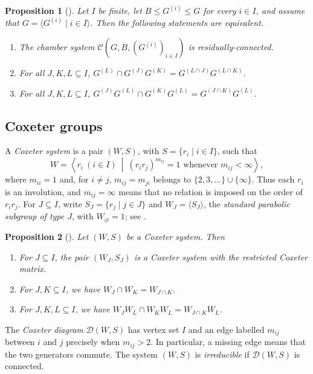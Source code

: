 \documentclass[10pt,a4paper]{amsart}
\newtheorem{prop}{Proposition}[section]
\newcommand{\DD}{\mathcal{D}}
\newcommand{\CC}{\mathcal{C}}
\begin{document}
\begin{prop}[{\cite[Theorem~3.6.9]{buekenhout2013diagram}}]
\label{prop:RC_CosetChamberSystem}
Let $I$ be finite, let $B\leq G^{(i)}\leq G$ for every $i\in I$, and assume
that $G=\langle G^{(i)}\mid i\in I\rangle$.  Then the following statements
are equivalent.
\begin{enumerate}
    \item The chamber system $\CC(G,B,(G^{(i)})_{i\in I})$ is residually-connected.
    \item For all $J,K,L\subseteq I$,
    $G^{(L)}\cap G^{(J)}G^{(K)}=G^{(L\cap J)}G^{(L\cap K)}$.
    \item For all $J,K,L\subseteq I$,
    $G^{(J)}G^{(L)}\cap G^{(K)}G^{(L)}=G^{(J\cap K)}G^{(L)}$.
\end{enumerate}
\end{prop}

\subsection{Coxeter groups}

A \emph{Coxeter system} is a pair $(W,S)$, with $S=\{r_i\mid i\in I\}$,
such that
\[
    W=\left\langle r_i\ (i\in I)\ \middle|\
       (r_ir_j)^{m_{ij}}=1\text{ whenever }m_{ij}<\infty\right\rangle,
\]
where $m_{ii}=1$ and, for $i\neq j$, $m_{ij}=m_{ji}$ belongs to
$\{2,3,\ldots\}\cup\{\infty\}$.  Thus each $r_i$ is an involution, and
$m_{ij}=\infty$ means that no relation is imposed on the order of $r_ir_j$.  For
$J\subseteq I$, write $S_J=\{r_j\mid j\in J\}$ and
$W_J=\langle S_J\rangle$, the \emph{standard parabolic subgroup of type
$J$}, with $W_\varnothing=1$; see \cite[Chapter~IV, Section~1]{Bourbaki2006}.

\begin{prop}[{\cite[Chapter~IV, Section~1, Theorem~2 and Exercise~1(b)]{Bourbaki2006}}]
\label{prop:CoxeterProperties}
Let $(W,S)$ be a Coxeter system.  Then
\begin{enumerate}
    \item For $J\subseteq I$, the pair $(W_J,S_J)$ is a Coxeter system
    with the restricted Coxeter matrix.
    \item For $J,K\subseteq I$, we have $W_J\cap W_K=W_{J\cap K}$.
    \item For $J,K,L\subseteq I$, we have
    $W_JW_L\cap W_KW_L=W_{J\cap K}W_L$.
\end{enumerate}
\end{prop}

The \emph{Coxeter diagram} $\DD(W,S)$ has vertex set $I$ and an edge
labelled $m_{ij}$ between $i$ and $j$ precisely when $m_{ij}>2$. In particular, a missing edge means that the
two generators commute.  The system $(W,S)$ is \emph{irreducible} if
$\DD(W,S)$ is connected.
\end{document}
